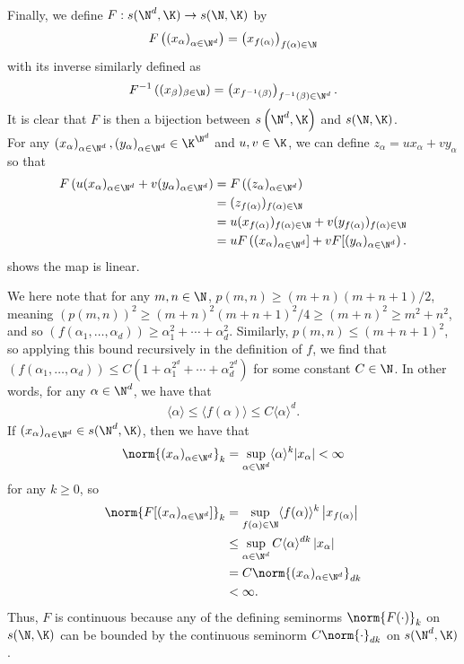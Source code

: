 \documentclass[10pt]{mypackage}
\newcommand{\brak}[1]{\langle #1 \rangle}
\begin{document}
\begin{solution}
Finally, we define $F:s(\N^d,\K)\to s(\N,\K)$ by 
\begin{align*}
 F\left( \left(x_\alpha\right)_{\alpha\in\N^d} \right) = \left(x_{f(\alpha)}\right)_{f\left(\alpha\right)\in\N} 
\end{align*}
with its inverse similarly defined as 
\begin{align*}
 F^{-1}\left( (x_\beta)_{\beta\in\N} \right) = \left(x_{f^{-1}(\beta)}\right)_{f^{-1}(\beta)\in\N^d}. 
\end{align*}
It is clear that $F$ is then a bijection between $s\left(\N^d,\K\right)$ and $s(\N,\K)$.\\

For any $\left(x_\alpha\right)_{\alpha\in\N^d},\left(y_\alpha\right)_{\alpha\in\N^d}\in\K^{\N^d}$ and $u,v\in\K$, we can define $z_\alpha = ux_\alpha + vy_\alpha$ so that
\begin{align*}
  F\left( u(x_\alpha)_{\alpha\in\N^d} + v(y_\alpha)_{\alpha\in\N^d} \right) &= F\left( (z_\alpha)_{\alpha\in\N^d} \right)\\
 &= (z_{f(\alpha)})_{f(\alpha)\in\N} \\
 &= u(x_{f(\alpha)})_{f(\alpha)\in\N} + v(y_{f(\alpha)})_{f(\alpha)\in\N}\\
 & = uF\left( (x_\alpha)_{\alpha\in\N^d}] + vF[(y_\alpha)_{\alpha\in\N^d} \right).
\end{align*}
shows the map is linear.

We here note that for any $m,n\in\N$, $p(m,n) \geq (m+n)(m+n+1)/2 $, meaning $ \left( p(m,n) \right)^2 \geq (m+n)^2(m+n+1)^2/4 \geq (m+n)^2 \geq m^2+n^2$, and so $\left( f(\alpha_1,\ldots,\alpha_d) \right) \geq \alpha_1^2+\cdots +\alpha_d^2$. Similarly, $p(m,n) \leq (m+n+1)^2$, so applying this bound recursively in the definition of $f$, we find that $\left( f(\alpha_1,\ldots,\alpha_d) \right) \leq C(1+\alpha_1^{2^d}+\cdots+\alpha_d^{2^d})$ for some constant $C\in \N$. In other words, for any $\alpha\in\N^d$, we have that
\begin{align*}
   \brak{\alpha} \leq \brak{f\left(\alpha\right)} \leq C\brak{\alpha}^d. 
\end{align*}
If $(x_\alpha)_{\alpha\in\N^d}\in s(\N^d,\K)$, then we have that
\begin{align*}
 \norm{(x_\alpha)_{\alpha\in\N^d}}_k = \sup_{\alpha\in\N^d}\brak{\alpha}^k|x_\alpha| < \infty 
\end{align*}
for any $k \geq 0$, so
\begin{align*}
\norm{F[(x_\alpha)_{\alpha\in\N^d}]}_k &= \sup_{f(\alpha)\in\N}\brak{f(\alpha)}^k\left\vert x_{f(\alpha)} \right\vert\\
                                       &\leq \sup_{\alpha\in\N^d}C\brak{\alpha}^{dk}\left\vert x_\alpha \right\vert\\
                                       &= C\norm{(x_\alpha)_{\alpha\in\N^d}}_{dk} \\
                                       & < \infty.
\end{align*}
Thus, $F$ is continuous because any of the defining seminorms $\norm{F(\cdot)}_k$ on $s(\N,\K)$ can be bounded by the continuous seminorm $C\norm{\cdot}_{dk}$ on $s(\N^d,\K)$.


\end{solution}
\end{document}
